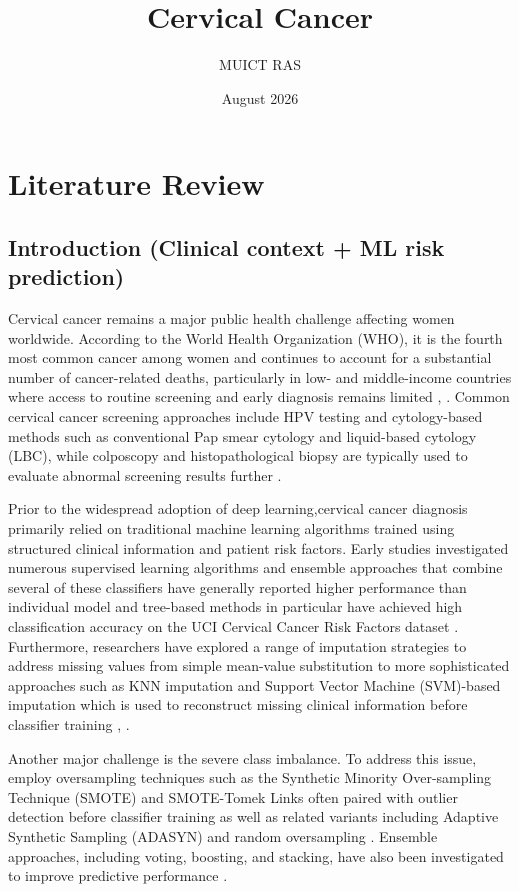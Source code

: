 \documentclass{article}
\title{Cervical Cancer}
\author{MUICT RAS}
\date{August 2026}
\begin{document}
\section{Literature Review}

\subsection{Introduction (Clinical context + ML risk prediction)}

Cervical cancer remains a major public health challenge affecting women worldwide. According to the World Health Organization (WHO), it is the fourth most common cancer among women and continues to account for a substantial number of cancer-related deaths, particularly in low- and middle-income countries where access to routine screening and early diagnosis remains limited \cite{WHO_cervical_cancer}, \cite{WHO_screening_guideline}. Common cervical cancer screening approaches include HPV testing and cytology-based methods such as conventional Pap smear cytology and liquid-based cytology (LBC), while colposcopy and histopathological biopsy are typically used to evaluate abnormal screening results further \cite{WHO_screening_guideline}.

Prior to the widespread adoption of deep learning,cervical cancer diagnosis primarily relied on traditional machine learning algorithms trained using structured clinical information and patient risk factors. Early studies investigated numerous supervised learning algorithms and ensemble approaches that combine several of these classifiers have generally reported higher performance than individual model and tree-based methods in particular have achieved high classification accuracy on the UCI Cervical Cancer Risk Factors dataset \cite{fernandes2017cervical}. Furthermore, researchers have explored a range of imputation strategies to address missing values from simple mean-value substitution to more sophisticated approaches such as KNN imputation and Support Vector Machine (SVM)-based imputation which is used to reconstruct missing clinical information before classifier training \cite{karamti2023improvingpr}, \cite{munshi2024novel}.

Another major challenge is the severe class imbalance. To address this issue, employ oversampling techniques such as the Synthetic Minority Over-sampling Technique (SMOTE) and SMOTE-Tomek Links often paired with outlier detection before classifier training  as well as related variants including Adaptive Synthetic Sampling (ADASYN) and random oversampling \cite{ijaz2020data}. Ensemble approaches, including voting, boosting, and stacking, have also been investigated to improve predictive performance \cite{sun2022stacking}. 
\end{document}
